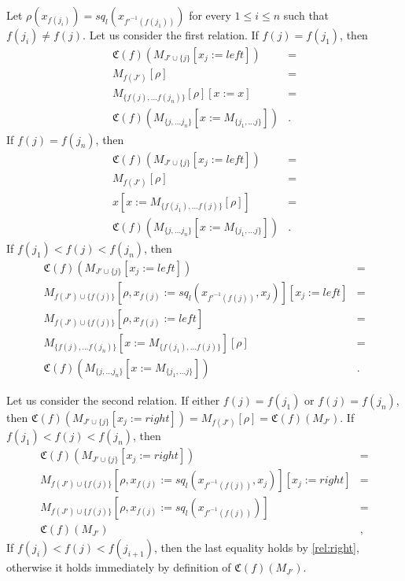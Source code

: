 \documentclass[reqno]{amsart}
\theoremstyle{definition}
\theoremstyle{remark}
\newcommand{\repl}{:=}
\numberwithin{figure}{section}
\begin{document}
Let $\rho(x_{f(j_i)}) = sq_l(x_{f'^{-1}(f(j_1))})$ for every $1 \leq i \leq n$ such that $f(j_i) \neq f(j)$.
Let us consider the first relation.
If $f(j) = f(j_1)$, then
\begin{align*}
\mathfrak{C}(f)(M_{J' \cup \{j\}}[x_j \repl left]) & = \\
M_{f(J')}[\rho] & = \\
M_{\{ f(j), \ldots f(j_n) \}}[\rho][x \repl x] & = \\
\mathfrak{C}(f)(M_{\{ j, \ldots j_n \}}[x \repl M_{\{ j_1, \ldots j \}}]) & .
\end{align*}
If $f(j) = f(j_n)$, then
\begin{align*}
\mathfrak{C}(f)(M_{J' \cup \{j\}}[x_j \repl left]) & = \\
M_{f(J')}[\rho] & = \\
x[x \repl M_{\{f(j_1), \ldots f(j)\}}[\rho]] & = \\
\mathfrak{C}(f)(M_{\{ j, \ldots j_n \}}[x \repl M_{\{ j_1, \ldots j \}}]) & .
\end{align*}
If $f(j_1) < f(j) < f(j_n)$, then
\begin{align*}
\mathfrak{C}(f)(M_{J' \cup \{j\}}[x_j \repl left]) & = \\
M_{f(J') \cup \{f(j)\}}[\rho, x_{f(j)} \repl sq_l(x_{f'^{-1}(f(j))}, x_j)][x_j \repl left] & = \\
M_{f(J') \cup \{f(j)\}}[\rho, x_{f(j)} \repl left] & = \\
M_{\{f(j), \ldots f(j_n)\}}[x \repl M_{\{f(j_1), \ldots f(j)\}}][\rho] & = \\
\mathfrak{C}(f)(M_{\{ j, \ldots j_n \}}[x \repl M_{\{ j_1, \ldots j \}}]) & .
\end{align*}

Let us consider the second relation.
If either $f(j) = f(j_1)$ or $f(j) = f(j_n)$, then $\mathfrak{C}(f)(M_{J' \cup \{j\}}[x_j \repl right]) = M_{f(J')}[\rho] = \mathfrak{C}(f)(M_{J'})$.
If $f(j_1) < f(j) < f(j_n)$, then
\begin{align*}
\mathfrak{C}(f)(M_{J' \cup \{j\}}[x_j \repl right]) & = \\
M_{f(J') \cup \{f(j)\}}[\rho, x_{f(j)} \repl sq_l(x_{f'^{-1}(f(j))}, x_j)][x_j \repl right] & = \\
M_{f(J') \cup \{f(j)\}}[\rho, x_{f(j)} \repl sq_l(x_{f'^{-1}(f(j))})] & = \\
\mathfrak{C}(f)(M_{J'}) & ,
\end{align*}
If $f(j_i) < f(j) < f(j_{i+1})$, then the last equality holds by \eqref{rel:right},
otherwise it holds immediately by definition of $\mathfrak{C}(f)(M_{J'})$.
\end{document}
